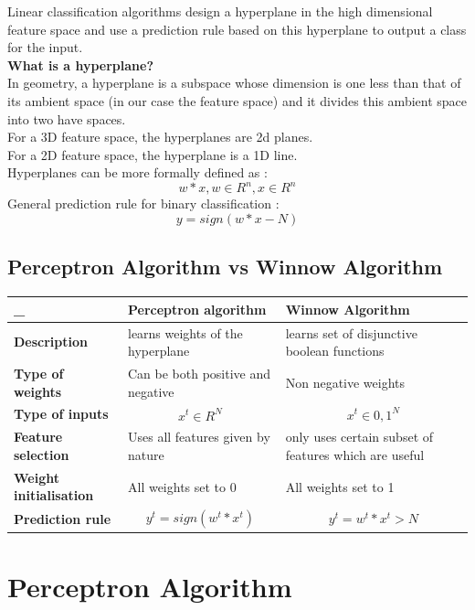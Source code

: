 \documentclass[11pt]{article}
\begin{document}
Linear classification algorithms design a hyperplane in the high dimensional feature space and use a prediction rule based on this hyperplane to output a class for  the input. \\
\textbf{What is a hyperplane?} \\
In geometry, a hyperplane is a subspace whose dimension is one less than that of its ambient space (in our case the feature space) and it divides this ambient space into two have spaces. \\
For a 3D feature space, the hyperplanes are 2d planes. \\
For a 2D feature space, the hyperplane is a 1D line.\\
Hyperplanes can be more formally defined as :
$$w*x, w \in R^n, x \in R^n$$
General prediction rule for binary classification :
$$ y = sign(w*x - N) $$


\subsection{Perceptron Algorithm vs Winnow Algorithm}

\begin{center}
\begin{tabular}{ | m{3cm} | m{6cm}| m{6cm} | } 
  \hline
  _ & \textbf{Perceptron algorithm} & \textbf{Winnow Algorithm} \\ 
  \hline
  \textbf{Description} & learns weights of the hyperplane & learns set of disjunctive boolean functions \\ 
  \hline
  \textbf{Type of weights} & Can be both positive and negative & Non negative weights \\ 
  \hline
  \textbf{Type of inputs} & $$ x^t \in R^N $$  & $$ x^t \in {0,1}^N $$ \\ 
  \hline
  \textbf{Feature selection} & Uses all features given by nature  & only uses certain subset of features which are useful \\ 
  \hline
  \textbf{Weight initialisation} & All weights set to 0  & All weights set to 1 \\ 
  \hline
  \textbf{Prediction rule} & $$ y^t =sign(w^t*x^t) $$  & $$ y^t =w^t*x^t > N $$ \\
  \hline
\end{tabular}
\end{center}



\section{Perceptron Algorithm}
\end{document}

